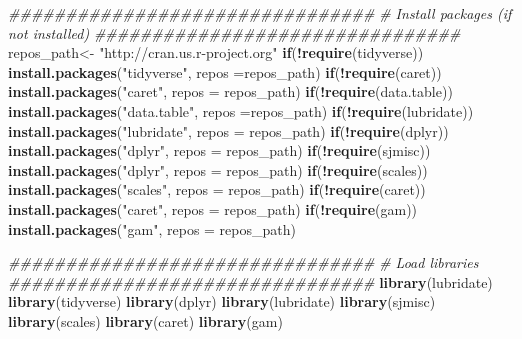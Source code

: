 \documentclass[]{article}
\newenvironment{Shaded}{\begin{snugshade}}{\end{snugshade}}
\newcommand{\CommentTok}[1]{\textcolor[rgb]{0.56,0.35,0.01}{\textit{#1}}}
\newcommand{\ControlFlowTok}[1]{\textcolor[rgb]{0.13,0.29,0.53}{\textbf{#1}}}
\newcommand{\DataTypeTok}[1]{\textcolor[rgb]{0.13,0.29,0.53}{#1}}
\newcommand{\KeywordTok}[1]{\textcolor[rgb]{0.13,0.29,0.53}{\textbf{#1}}}
\newcommand{\NormalTok}[1]{#1}
\newcommand{\OperatorTok}[1]{\textcolor[rgb]{0.81,0.36,0.00}{\textbf{#1}}}
\newcommand{\StringTok}[1]{\textcolor[rgb]{0.31,0.60,0.02}{#1}}
\begin{document}
\begin{Shaded}
\begin{Highlighting}[]
\CommentTok{################################}
\CommentTok{#  Install packages (if not installed)}
\CommentTok{################################}
\NormalTok{repos_path<-}\StringTok{ "http://cran.us.r-project.org"}
\ControlFlowTok{if}\NormalTok{(}\OperatorTok{!}\KeywordTok{require}\NormalTok{(tidyverse)) }\KeywordTok{install.packages}\NormalTok{(}\StringTok{"tidyverse"}\NormalTok{, }\DataTypeTok{repos =}\NormalTok{repos_path)}
\ControlFlowTok{if}\NormalTok{(}\OperatorTok{!}\KeywordTok{require}\NormalTok{(caret)) }\KeywordTok{install.packages}\NormalTok{(}\StringTok{"caret"}\NormalTok{, }\DataTypeTok{repos =}\NormalTok{ repos_path)}
\ControlFlowTok{if}\NormalTok{(}\OperatorTok{!}\KeywordTok{require}\NormalTok{(data.table)) }\KeywordTok{install.packages}\NormalTok{(}\StringTok{"data.table"}\NormalTok{, }\DataTypeTok{repos =}\NormalTok{repos_path)}
\ControlFlowTok{if}\NormalTok{(}\OperatorTok{!}\KeywordTok{require}\NormalTok{(lubridate)) }\KeywordTok{install.packages}\NormalTok{(}\StringTok{"lubridate"}\NormalTok{, }\DataTypeTok{repos =}\NormalTok{ repos_path)}
\ControlFlowTok{if}\NormalTok{(}\OperatorTok{!}\KeywordTok{require}\NormalTok{(dplyr)) }\KeywordTok{install.packages}\NormalTok{(}\StringTok{"dplyr"}\NormalTok{, }\DataTypeTok{repos =}\NormalTok{ repos_path)}
\ControlFlowTok{if}\NormalTok{(}\OperatorTok{!}\KeywordTok{require}\NormalTok{(sjmisc)) }\KeywordTok{install.packages}\NormalTok{(}\StringTok{"dplyr"}\NormalTok{, }\DataTypeTok{repos =}\NormalTok{ repos_path)}
\ControlFlowTok{if}\NormalTok{(}\OperatorTok{!}\KeywordTok{require}\NormalTok{(scales)) }\KeywordTok{install.packages}\NormalTok{(}\StringTok{"scales"}\NormalTok{, }\DataTypeTok{repos =}\NormalTok{ repos_path)}
\ControlFlowTok{if}\NormalTok{(}\OperatorTok{!}\KeywordTok{require}\NormalTok{(caret)) }\KeywordTok{install.packages}\NormalTok{(}\StringTok{"caret"}\NormalTok{, }\DataTypeTok{repos =}\NormalTok{ repos_path)}
\ControlFlowTok{if}\NormalTok{(}\OperatorTok{!}\KeywordTok{require}\NormalTok{(gam)) }\KeywordTok{install.packages}\NormalTok{(}\StringTok{"gam"}\NormalTok{, }\DataTypeTok{repos =}\NormalTok{ repos_path)}

\CommentTok{################################}
\CommentTok{# Load libraries}
\CommentTok{################################}
\KeywordTok{library}\NormalTok{(lubridate)}
\KeywordTok{library}\NormalTok{(tidyverse)}
\KeywordTok{library}\NormalTok{(dplyr)}
\KeywordTok{library}\NormalTok{(lubridate)}
\KeywordTok{library}\NormalTok{(sjmisc)}
\KeywordTok{library}\NormalTok{(scales)}
\KeywordTok{library}\NormalTok{(caret)}
\KeywordTok{library}\NormalTok{(gam)}
\end{Highlighting}
\end{Shaded}
\end{document}
